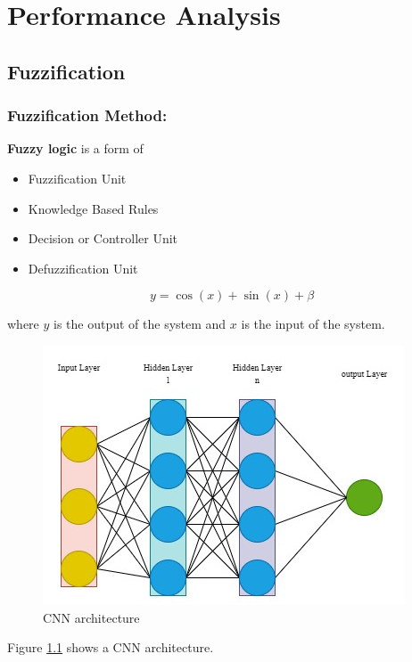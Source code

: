 \chapter{Performance Analysis}
\section{Fuzzification}
\subsection{Fuzzification Method:}
\textbf{Fuzzy logic} is a form of 
\begin{itemize}
    \item Fuzzification Unit
    \item Knowledge Based Rules
    \item Decision or Controller Unit
    \item Defuzzification Unit
\end{itemize}


\begin{equation}
    y=\cos(x)+\sin(x) +\beta
\end{equation}

where $y$ is the output of the system and $x$ is the input of the system.

\begin{figure}[ht!] %
    \centering
    \includegraphics[scale=0.5]{Chap5/cnn1.jpg}
    \caption{CNN architecture}
    \label{fig:CNN}
\end{figure}


Figure \ref{fig:CNN} shows a CNN architecture. 


